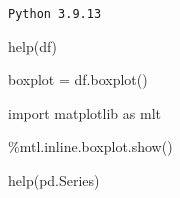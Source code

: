 \documentclass[
  letterpaper,
  DIV=11,
  numbers=noendperiod]{scrreprt}
\newenvironment{Shaded}{\begin{snugshade}}{\end{snugshade}}
\newcommand{\BuiltInTok}[1]{\textcolor[rgb]{0.00,0.23,0.31}{#1}}
\newcommand{\ImportTok}[1]{\textcolor[rgb]{0.00,0.46,0.62}{#1}}
\newcommand{\NormalTok}[1]{\textcolor[rgb]{0.00,0.23,0.31}{#1}}
\newcommand{\OperatorTok}[1]{\textcolor[rgb]{0.37,0.37,0.37}{#1}}
\begin{document}
\begin{verbatim}
Python 3.9.13
\end{verbatim}

\begin{Shaded}
\begin{Highlighting}[]
\BuiltInTok{help}\NormalTok{(df)}
\end{Highlighting}
\end{Shaded}

\begin{Shaded}
\begin{Highlighting}[]
\NormalTok{boxplot }\OperatorTok{=}\NormalTok{ df.boxplot()}

\ImportTok{import}\NormalTok{ matplotlib }\ImportTok{as}\NormalTok{ mlt}

\OperatorTok{\%}\NormalTok{mtl.inline.boxplot.show()}
\end{Highlighting}
\end{Shaded}

\begin{Shaded}
\begin{Highlighting}[]
\BuiltInTok{help}\NormalTok{(pd.Series)}
\end{Highlighting}
\end{Shaded}
\end{document}
